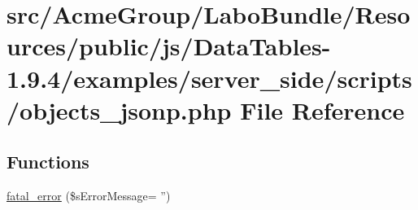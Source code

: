 \hypertarget{objects__jsonp_8php}{\section{src/\+Acme\+Group/\+Labo\+Bundle/\+Resources/public/js/\+Data\+Tables-\/1.9.4/examples/server\+\_\+side/scripts/objects\+\_\+jsonp.php File Reference}
\label{objects__jsonp_8php}
}
\subsection*{Functions}
\begin{DoxyCompactItemize}
\item 
\hyperlink{objects__jsonp_8php_a1bb235f2e57f0389e14b11592d32119a}{fatal\+\_\+error} (\$s\+Error\+Message= '')
\end{DoxyCompactItemize}
